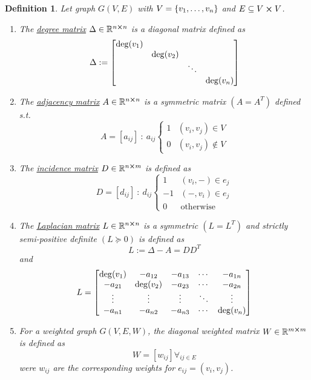 \documentclass[]{article}
\numberwithin{equation}{section}
\newcommand{\R}{\mathbb{R}}
\newcommand{\st}{\ : \ }
\newtheorem{definition}{Definition}
\begin{document}
\begin{definition} \label{def:graph_matrices}
	Let graph $G(V,E)$ with $V = \qty{v_1,\dots,v_n}$ and $E \subseteq V \cross V$.
	\begin{enumerate}
		\item The \underline{\emph{degree matrix}} $\Delta \in \R^{n\cross n}$ is a diagonal matrix defined as \[
			\Delta := \mqty[\dmat{\deg(v_1), \deg(v_2), \ddots, \deg(v_n)}]
		\]
		\item The \emph{\underline{adjacency matrix}} $A \in \R^{n\cross n}$ is a symmetric matrix $(A = A^T)$ defined s.t. \[
			A = [a_{ij}] \st a_{ij} \begin{cases}
				1 &(v_i,v_j) \in V\\
				0 &(v_i,v_j) \notin V
			\end{cases}
		\]
		\item The \emph{\underline{incidence matrix}} $D \in \R^{n \cross m}$ is defined as\[
			D = [d_{ij}] \st d_{ij} \begin{cases}
				1 	&(v_i,-) \in e_{j}\\
				-1	&(-,v_i) \in e_{j}\\
				0	&\text{otherwise}
			\end{cases}
		\]
		\item The \emph{\underline{Laplacian matrix}} $L \in \R^{n \cross n}$ is a symmetric $(L = L^T)$ and strictly semi-positive definite $(L \succeq 0)$ is defined as\[
			L := \Delta - A = D D^T
		\]and\[
			L = \mqty[
				\deg(v_1)	&-a_{12}	&-a_{13}	&\cdots	&-a_{1n}\\
				-a_{21}		&\deg(v_2)	&-a_{23}	&\cdots	&-a_{2n}\\
				\vdots		&\vdots		&\vdots		&\ddots	&\vdots\\
				-a_{n1}		&-a_{n2}	&-a_{n3}	&\cdots	&\deg(v_n)
			]
		\]
		\item For a weighted graph $G(V,E,W)$, the diagonal weighted matrix $W\in \R^{m\cross m}$ is defined as\[
			W = [w_{ij}] \forall_{ij \in E}
		\]
		were $w_{ij}$ are the corresponding weights for $e_{ij} = (v_i,v_j)$.
	\end{enumerate}
\end{definition}



\end{document}
